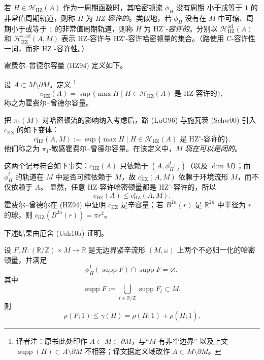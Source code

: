\begin{definition}
\label{def:22-hz-admissible}
若 $H\in\mathcal H_{\mathrm{HZ}}(A)$ 作为一周期函数时，其哈密顿流 $\phi_H$ 没有周期
小于或等于 $1$ 的非常值周期轨道，则称 $H$ 为 \emph{HZ-容许的}。类似地，若
$\phi_H$ 没有在 $M$ 中可缩、周期小于或等于 $1$ 的非常值周期轨道，则称 $H$ 为
\emph{$\mathrm{HZ}^\circ$-容许的}。分别以
$\mathcal H_{\mathrm{HZ}}^{\mathrm{ad}}(A)$ 和
$\mathcal H_{\mathrm{HZ}}^{\circ,\mathrm{ad}}(A,M)$ 表示 HZ-容许与
$\mathrm{HZ}^\circ$-容许哈密顿量的集合。（路使用 C-容许性一词，而非
$\mathrm{HZ}^\circ$-容许性。）
\end{definition}

霍费尔--曾德尔容量 (HZ94) 定义如下。

\begin{definition}
\label{def:22-hofer-zehnder-capacity}
设 $A\subset M\setminus\partial M$。定义
\footnote{译者注：原书此处印作 $A\subset M\subset\partial M$，与“$M$ 有非空边界”
以及上文 $\operatorname{supp}(H)\subset A\setminus\partial M$ 不相容；译文据定义域改作
$A\subset M\setminus\partial M$。}
\[
 c_{\mathrm{HZ}}(A)=\sup\{\max H\mid
 H\in\mathcal H_{\mathrm{HZ}}(A)\text{ 是 HZ-容许的}\},
\]
称之为霍费尔--曾德尔容量。
\end{definition}

把 $\pi_1(M)$ 对哈密顿流的影响纳入考虑后，路 (LuG96) 与施瓦茨 (Schw00) 引入
$c_{\mathrm{HZ}}$ 的如下变体：
\[
 c_{\mathrm{HZ}}^\circ(A,M)
 :=\sup\{\max H\mid H\in\mathcal H_{\mathrm{HZ}}(A)
 \text{ 是 $\mathrm{HZ}^\circ$-容许的}\}.
\]
他们称之为 $\pi_1$-敏感霍费尔--曾德尔容量。在该定义中，$M$ \emph{现在可以是闭的}。

这两个记号符合如下事实：$c_{\mathrm{HZ}}(A)$ 只依赖于
$(A,\phi_H^t|_A)$（以及 $\dim M$）；而 $\phi_H^t$ 的轨道在 $M$ 中是否可缩依赖于
$M$，故 $c_{\mathrm{HZ}}^\circ(A,M)$ 依赖于环境流形 $M$，而不仅依赖于 $A$。
显然，任意 HZ-容许哈密顿量都是 $\mathrm{HZ}^\circ$-容许的，所以
\[
 c_{\mathrm{HZ}}(A)\leq c_{\mathrm{HZ}}^\circ(A,M).
\]
霍费尔--曾德尔在 (HZ94) 中证明 $c_{\mathrm{HZ}}$ 是辛容量；若
$B^{2n}(r)$ 是 $\mathbb R^{2n}$ 中半径为 $r$ 的球，则
$c_{\mathrm{HZ}}(B^{2n}(r))=\pi r^2$。

下述结果由厄舍 (Ush10a) 证明。

\begin{proposition}
\label{prop:22-displaced-support-spectral-bound}
设 $F,H:(\mathbb R/\mathbb Z)\times M\to\mathbb R$ 是无边界紧辛流形
$(M,\omega)$ 上两个不必归一化的哈密顿量，并满足
\[
 \phi_H^1(\operatorname{supp}F)\cap\operatorname{supp}F=\varnothing,
\]
其中
\[
 \operatorname{supp}F:=\bigcup_{t\in\mathbb R/\mathbb Z}
 \operatorname{supp}F_t\subset M.
\]
则
\[
 \rho(F;1)\leq\gamma(H)
 =\rho(H;1)+\rho(\overline H;1).
\]
\end{proposition}

